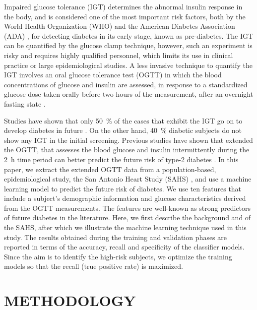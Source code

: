 \documentclass[a4paper,twoside]{article}
\begin{document}
Impaired glucose tolerance (IGT) determines the abnormal insulin response in the body, and is considered one of the most important risk factors, both by the World Health Organization (WHO) \cite{organization_definition_2006} and the American Diabetes Association (ADA) \cite{american_diabetes_association_diagnosis_2005}, for detecting diabetes in its early stage, known as pre-diabetes. The IGT can be quantified by the glucose clamp technique, however, such an experiment is risky and requires highly qualified personnel, which limits its use in clinical practice or large epidemiological studies. A less invasive technique to quantify the IGT involves an oral glucose tolerance test (OGTT) in which the blood concentrations of glucose and insulin are assessed, in response to a standardized glucose dose taken orally before two hours of the measurement, after an overnight fasting state \cite{tschritter_assessing_2003}.

Studies have shown that only \SI{50}{\percent} of the cases that exhibit the IGT go on to develop diabetes in future \cite{shaw_impaired_1999,writing_committee_impaired_2002}. On the other hand, \SI{40}{\percent} diabetic subjects do not show any IGT in the initial screening. Previous studies have shown that extended the OGTT, that assesses the blood glucose and insulin intermittently during the \SI{2}{\hour} time period can better predict the future risk of type-2 diabetes \cite{abdul-ghani_what_2007}. In this paper, we extract the extended OGTT data from a population-based, epidemiological study, the San Antonio Heart Study (SAHS) \cite{burke_rapid_1999,lorenzo_trend_2006}, and use a machine learning model to predict the future risk of diabetes. We use ten features that include a subject's demographic information and glucose characteristics derived from the OGTT measurements. The features are well-known as strong predictors of future diabetes in the literature. Here, we first describe the background and of the SAHS, after which we illustrate the machine learning technique used in this study. The results obtained during the training and validation phases are reported in terms of the accuracy, recall and specificity of the classifier models. Since the aim is to identify the high-risk subjects, we optimize the training models so that the recall (true positive rate) is maximized.
\section{\uppercase{Methodology}}
%
\end{document}
